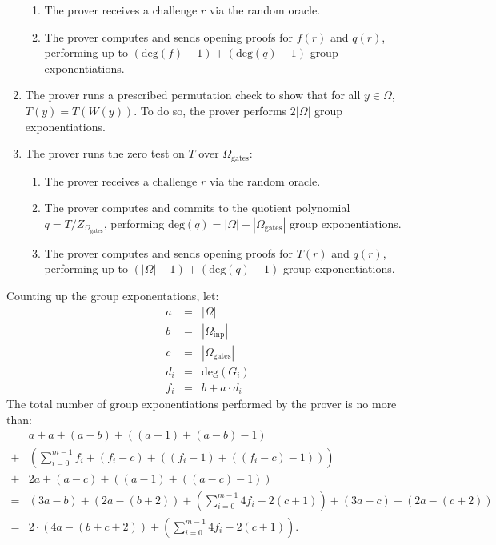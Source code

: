 \documentclass[11pt]{article}
\begin{document}
\begin{enumerate}
\begin{enumerate}
			\item The prover receives a challenge $r$ via the random oracle.
			\item The prover computes and sends opening proofs for $f(r)$ and $q(r)$,
				performing up to $(\text{deg}(f) - 1) + (\text{deg}(q) - 1)$ group exponentiations.
		\end{enumerate}
	\item The prover runs a prescribed permutation check to show that for all $y \in \Omega$, $T(y) = T(W(y))$.
		To do so, the prover performs $2|\Omega|$ group exponentiations.
	\item The prover runs the zero test on $T$ over $\Omega_{\text{gates}}$:
		\begin{enumerate}
			\item The prover receives a challenge $r$ via the random oracle.
			\item The prover computes and commits to the quotient polynomial
				$q = T / Z_{\Omega_{\text{gates}}}$, performing
				$\text{deg}(q) = |\Omega| - |\Omega_{\text{gates}}|$ group exponentiations.
			\item The prover computes and sends opening proofs for $T(r)$ and $q(r)$,
				performing up to $(|\Omega| - 1) + (\text{deg}(q) - 1)$ group exponentiations.
		\end{enumerate}
\end{enumerate}

Counting up the group exponentations, let:
\begin{equation}
	\begin{array}{rcl}
		a &=& |\Omega| \\
		b &=& |\Omega_{\text{inp}}| \\
		c &=& |\Omega_{\text{gates}}| \\
		d_i &=& \text{deg}(G_i) \\
		f_i &=& b + a \cdot d_i
	\end{array}
\end{equation}
The total number of group exponentiations performed by the prover is no more than:
\begin{equation}
	\begin{array}{rl}
		& a + a + (a - b) + ((a - 1) + (a - b) - 1) \\
		+ & \left ( \sum_{i=0}^{m-1} f_i + (f_i - c) + ((f_i - 1) + ((f_i - c) - 1)) \right ) \\
		+ & 2a + (a - c) + ((a - 1) + ((a - c) - 1)) \\
		= & (3a - b) + (2a - (b + 2)) + \left ( \sum_{i=0}^{m-1} 4f_i - 2(c + 1) \right ) + (3a - c) + (2a - (c + 2)) \\
		= & 2 \cdot (4a - (b + c + 2)) + \left ( \sum_{i=0}^{m-1} 4f_i - 2(c + 1) \right ).
	\end{array}
\end{equation}
\end{document}
